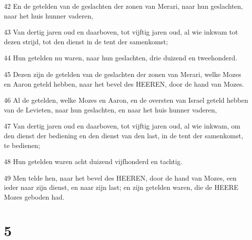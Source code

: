 \par 42 En de getelden van de geslachten der zonen van Merari, naar hun geslachten, naar het huis hunner vaderen,
\par 43 Van dertig jaren oud en daarboven, tot vijftig jaren oud, al wie inkwam tot dezen strijd, tot den dienst in de tent der samenkomst;
\par 44 Hun getelden nu waren, naar hun geslachten, drie duizend en tweehonderd.
\par 45 Dezen zijn de getelden van de geslachten der zonen van Merari, welke Mozes en Aaron geteld hebben, naar het bevel des HEEREN, door de hand van Mozes.
\par 46 Al de getelden, welke Mozes en Aaron, en de oversten van Israel geteld hebben van de Levieten, naar hun geslachten, en naar het huis hunner vaderen,
\par 47 Van dertig jaren oud en daarboven, tot vijftig jaren oud, al wie inkwam, om den dienst der bediening en den dienst van den last, in de tent der samenkomst, te bedienen;
\par 48 Hun getelden waren acht duizend vijfhonderd en tachtig.
\par 49 Men telde hen, naar het bevel des HEEREN, door de hand van Mozes, een ieder naar zijn dienst, en naar zijn last; en zijn getelden waren, die de HEERE Mozes geboden had.

\chapter{5}

